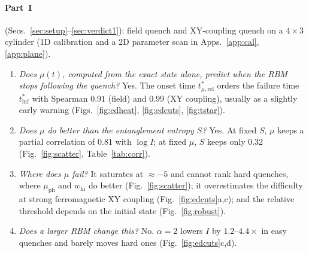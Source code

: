 \documentclass[11pt,a4paper]{article}
\newcommand{\inff}{I}
\newcommand{\tmur}{t^*_{\mu,\mathrm{rel}}}
\newcommand{\tinf}{t^*_{\mathrm{inf}}}
\begin{document}
\paragraph{Part~I} (Secs.~\ref{sec:setup}--\ref{sec:verdict1}): field quench and XY-coupling quench on a $4\times3$
cylinder (1D calibration and a 2D parameter scan in Apps.~\ref{app:cal}, \ref{app:plane}).
\begin{enumerate}
  \item \emph{Does $\mu(t)$, computed from the exact state alone, predict when the RBM stops following the quench?}
    Yes. The onset time $\tmur$ orders the failure time $\tinf$ with Spearman $0.91$ (field) and $0.99$ (XY coupling),
    usually as a slightly early warning (Figs.~\ref{fig:edheat}, \ref{fig:edcuts}, \ref{fig:tstar}).
  \item \emph{Does $\mu$ do better than the entanglement entropy $S$?}
    Yes. At fixed $S$, $\mu$ keeps a partial correlation of $0.81$ with $\log\inff$; at fixed $\mu$, $S$ keeps only
    $0.32$ (Fig.~\ref{fig:scatter}, Table~\ref{tab:corr}).
  \item \emph{Where does $\mu$ fail?}
    It saturates at $\approx-5$ and cannot rank hard quenches, where $\mu_{\mathrm{ph}}$ and $w_{\mathrm{hi}}$ do
    better (Fig.~\ref{fig:scatter}); it overestimates the difficulty at strong ferromagnetic XY coupling
    (Fig.~\ref{fig:edcuts}a,c); and the relative threshold depends on the initial state (Fig.~\ref{fig:robust}).
  \item \emph{Does a larger RBM change this?}
    No. $\alpha=2$ lowers $\inff$ by $1.2$--$4.4\times$ in easy quenches and barely moves hard ones
    (Fig.~\ref{fig:edcuts}c,d).
\end{enumerate}
\end{document}
